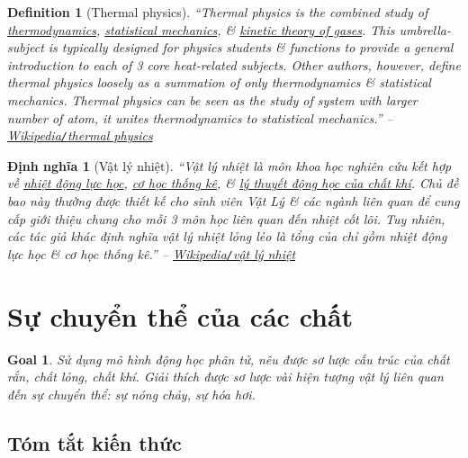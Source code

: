 \documentclass{article}
\newtheorem{definition}{Definition}
\newtheorem{dinhnghia}{Định nghĩa}
\newtheorem{goal}{Goal}
\begin{document}
\begin{definition}[Thermal physics]
	``{\rm Thermal physics} is the combined study of \href{https://en.wikipedia.org/wiki/Thermodynamics}{thermodynamics}, \href{https://en.wikipedia.org/wiki/Statistical_mechanics}{statistical mechanics}, \& \href{https://en.wikipedia.org/wiki/Kinetic_theory_of_gases}{kinetic theory of gases}. This umbrella-subject is typically designed for physics students \& functions to provide a general introduction to each of 3 core heat-related subjects. Other authors, however, define thermal physics loosely as a summation of only thermodynamics \& statistical mechanics. Thermal physics can be seen as the study of system with larger number of atom, it unites thermodynamics to statistical mechanics.'' -- \href{https://en.wikipedia.org/wiki/Thermal_physics}{Wikipedia{\tt/}thermal physics}
\end{definition}

\begin{dinhnghia}[Vật lý nhiệt]
	``{\rm Vật lý nhiệt} là môn khoa học nghiên cứu kết hợp về \href{https://vi.wikipedia.org/wiki/Nhi%E1%BB%87t_%C4%91%E1%BB%99ng_l%E1%BB%B1c_h%E1%BB%8Dc}{nhiệt động lực học}, \href{https://vi.wikipedia.org/wiki/C%C6%A1_h%E1%BB%8Dc_th%E1%BB%91ng_k%C3%AA}{cơ học thống kê}, \& \href{https://vi.wikipedia.org/wiki/Thuy%E1%BA%BFt_%C4%91%E1%BB%99ng_h%E1%BB%8Dc_ch%E1%BA%A5t_kh%C3%AD}{lý thuyết động học của chất khí}. Chủ đề bao này thường được thiết kế cho sinh viên Vật Lý \& các ngành liên quan để cung cấp giới thiệu chung cho mỗi 3 môn học liên quan đến nhiệt cốt lõi. Tuy nhiên, các tác giả khác định nghĩa vật lý nhiệt lỏng lẻo là tổng của chỉ gồm nhiệt động lực học \& cơ học thống kê.'' -- \href{https://vi.wikipedia.org/wiki/V%E1%BA%ADt_l%C3%BD_nhi%E1%BB%87t}{Wikipedia{\tt/}vật lý nhiệt}
\end{dinhnghia}

\section{Sự chuyển thể của các chất}

\begin{goal}
	Sử dụng mô hình động học phân tử, nêu được sơ lược cấu trúc của chất rắn, chất lỏng, chất khí. Giải thích được sơ lược vài hiện tượng vật lý liên quan đến sự chuyển thể: sự nóng chảy, sự hóa hơi.
\end{goal}

\subsection{Tóm tắt kiến thức}
\end{document}

